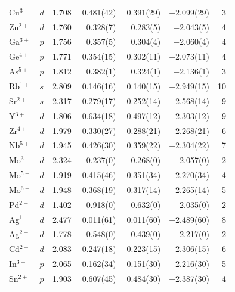 \begin{longtable}{l l r r r r r}
  Cu$^{3+}$            & $d$   & 1.708 &      0.481(42) &      0.391(29) &   $-$2.099(29) & 3 \\
  Zn$^{2+}$            & $d$   & 1.760 &       0.328(7) &       0.283(5) &    $-$2.043(5) & 4 \\
  Ga$^{3+}$            & $p$   & 1.756 &       0.357(5) &       0.304(4) &    $-$2.060(4) & 4 \\
  Ge$^{4+}$            & $p$   & 1.771 &      0.354(15) &      0.302(11) &   $-$2.073(11) & 4 \\
  As$^{5+}$            & $p$   & 1.812 &       0.382(1) &       0.324(1) &    $-$2.136(1) & 3 \\
  Rb$^{1+}$            & $s$   & 2.809 &      0.146(16) &      0.140(15) &   $-$2.949(15) & 10 \\
  Sr$^{2+}$            & $s$   & 2.317 &      0.279(17) &      0.252(14) &   $-$2.568(14) & 9 \\
  Y$^{3+}$             & $d$   & 1.806 &      0.634(18) &      0.497(12) &   $-$2.303(12) & 9 \\
  Zr$^{4+}$            & $d$   & 1.979 &      0.330(27) &      0.288(21) &   $-$2.268(21) & 6 \\
  Nb$^{5+}$            & $d$   & 1.945 &      0.426(30) &      0.359(22) &   $-$2.304(22) & 7 \\
  Mo$^{3+}$            & $d$   & 2.324 &    $-$0.237(0) &    $-$0.268(0) &    $-$2.057(0) & 2 \\
  Mo$^{5+}$            & $d$   & 1.919 &      0.415(46) &      0.351(34) &   $-$2.270(34) & 4 \\
  Mo$^{6+}$            & $d$   & 1.948 &      0.368(19) &      0.317(14) &   $-$2.265(14) & 5 \\
  Pd$^{2+}$            & $d$   & 1.402 &       0.918(0) &       0.632(0) &    $-$2.035(0) & 2 \\
  Ag$^{1+}$            & $d$   & 2.477 &      0.011(61) &      0.011(60) &   $-$2.489(60) & 8 \\
  Ag$^{2+}$            & $d$   & 1.778 &       0.548(0) &       0.439(0) &    $-$2.217(0) & 2 \\
  Cd$^{2+}$            & $d$   & 2.083 &      0.247(18) &      0.223(15) &   $-$2.306(15) & 6 \\
  In$^{3+}$            & $p$   & 2.065 &      0.162(34) &      0.151(30) &   $-$2.216(30) & 5 \\
  Sn$^{2+}$            & $p$   & 1.903 &      0.607(45) &      0.484(30) &   $-$2.387(30) & 4 \\

\end{longtable}
